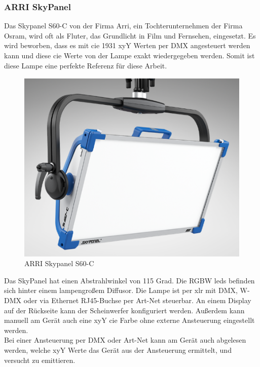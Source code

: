 \documentclass[11pt]{scrartcl}
\begin{document}
\subsubsection{ARRI SkyPanel}
Das Skypanel S60-C von der Firma Arri, ein Tochterunternehmen der Firma Osram, wird oft als Fluter, das Grundlicht in Film und Fernsehen, eingesetzt.
Es wird beworben, dass es mit \ac{cie} 1931 xyY Werten per DMX angesteuert werden kann und diese \ac{cie} Werte von der Lampe exakt wiedergegeben werden. Somit
ist diese Lampe eine perfekte Referenz für diese Arbeit.
\begin{figure}[H]
    \begin{center}
        \includegraphics[width=.48\textwidth]{images/skypanel_s60_c.png}
    \end{center}
    \caption{ARRI Skypanel S60-C \cite{arri}}
\end{figure}
\noindent
Das SkyPanel hat einen Abstrahlwinkel von 115 Grad. Die RGBW \ac{led}s befinden sich hinter einem lampengroßem Diffusor. Die Lampe ist per
\ac{xlr} mit DMX, W-DMX oder via Ethernet RJ45-Buchse per Art-Net steuerbar. An einem Display auf der Rückseite kann der Scheinwerfer konfiguriert
werden. Außerdem kann manuell am Gerät auch eine xyY \ac{cie} Farbe ohne externe Ansteuerung eingestellt werden.\\
Bei einer Ansteuerung per DMX oder Art-Net kann am Gerät auch abgelesen werden, welche xyY Werte das Gerät aus der Ansteuerung ermittelt,
und versucht zu emittieren.
\end{document}
